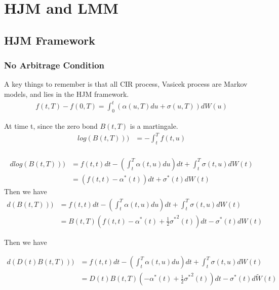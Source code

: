 \section{HJM and LMM}
\subsection{HJM Framework}
\subsubsection{No Arbitrage Condition}
A key things to remember is that {\color{red}all CIR process, Vasicek process are Markov models, and lies in the HJM framework}.
\begin{equation}
\begin{aligned}
f(t, T) - f(0, T) =  \int_0^t (\alpha(u, T)du + \sigma(u, T)) dW(u)
\end{aligned}
\end{equation}

At time t, since the zero bond $B(t, T)$ is a martingale.
 \begin{equation}
\begin{aligned}
log(B(t, T))) &= -\int_t^Tf(t, u)\\
\end{aligned}
\end{equation}

 \begin{equation}
\begin{aligned}
dlog(B(t, T))) &= f(t, t)dt - (\int_t^T \alpha(t, u) du)dt +\int_t^T \sigma(t, u) dW(t) \\
                     &= (f(t, t) - \alpha^\ast(t))dt + \sigma^\ast(t) dW(t)
\end{aligned}
\end{equation}
Then we have
 \begin{equation}
\begin{aligned}
d(B(t, T))) &= f(t, t)dt - (\int_t^T \alpha(t, u) du)dt +\int_t^T \sigma(t, u) dW(t) \\
                     &=B(t, T) (f(t, t) - \alpha^\ast(t) + \frac{1}{2} {\sigma^\ast}^2(t)) dt - \sigma^\ast(t) dW(t)
\end{aligned}
\end{equation}

Then we have

\begin{equation}
\begin{aligned}
d(D(t)B(t, T))) &= f(t, t)dt - (\int_t^T \alpha(t, u) du)dt +\int_t^T \sigma(t, u) dW(t) \\
                     &=D(t)B(t, T) (-\alpha^\ast(t) + \frac{1}{2} {\sigma^\ast}^2(t)) dt - \sigma^\ast(t) d\widetilde{W}(t)
\end{aligned}
\end{equation}

